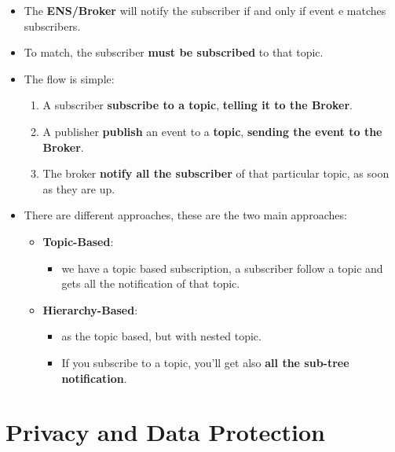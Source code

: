\documentclass[9pt, letterpaper]{article}
\begin{document}
\begin{itemize}
	\item The \textbf{ENS/Broker} will notify the subscriber if and only if event e matches subscribers.
	\item To match, the subscriber \textbf{must be subscribed} to that topic.
	\item The flow is simple:
	      \begin{enumerate}
		      \item A subscriber \textbf{subscribe to a topic}, \textbf{telling it to the Broker}.
		      \item A publisher \textbf{publish} an event to a \textbf{topic}, \textbf{sending the event to the Broker}.
		      \item The broker \textbf{notify all the subscriber} of that particular topic, as soon as they are up.
	      \end{enumerate}
	\item There are different approaches, these are the two main approaches:
	      \begin{itemize}
		      \item \textbf{Topic-Based}:
		            \begin{itemize}
			            \item we have a topic based subscription, a subscriber follow a topic and gets all the notification of that topic.
		            \end{itemize}
		      \item \textbf{Hierarchy-Based}:
		            \begin{itemize}
			            \item as the topic based, but with nested topic.
			            \item If you subscribe to a topic, you'll get also \textbf{all the sub-tree notification}.
		            \end{itemize}
	      \end{itemize}
\end{itemize}

\newpage

\section{Privacy and Data Protection}
\end{document}
